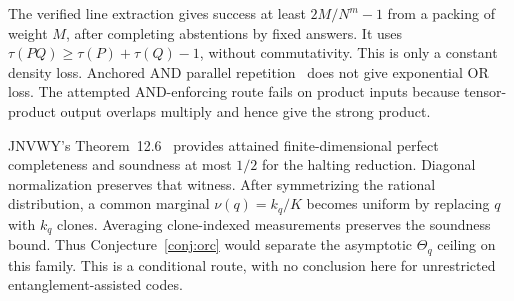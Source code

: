 The verified line extraction gives success at least $2M/N^m-1$ from
a packing of weight $M$, after completing abstentions by fixed answers.
It uses $\tau(PQ)\geq\tau(P)+\tau(Q)-1$, without commutativity.
This is only a constant density loss. Anchored AND parallel
repetition~\cite{BVY} does not give exponential OR loss.
The attempted AND-enforcing route fails on product
inputs because tensor-product output overlaps multiply and hence give
the strong product.

JNVWY's Theorem~12.6~\cite{JNVWY} provides attained finite-dimensional
perfect completeness and soundness at most $1/2$ for the halting
reduction. Diagonal normalization preserves that witness. After
symmetrizing the rational distribution, a common marginal
$\nu(q)=k_q/K$ becomes uniform by replacing $q$ with $k_q$ clones.
Averaging clone-indexed measurements preserves the soundness bound.
Thus Conjecture~\ref{conj:orc} would separate the asymptotic $\Theta_q$
ceiling on this family. This is a conditional route, with no conclusion
here for unrestricted entanglement-assisted codes.
